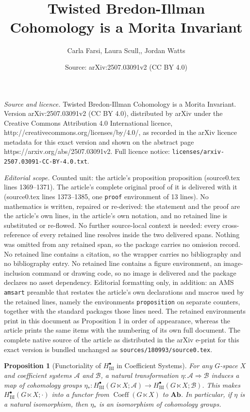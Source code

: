 \documentclass[10pt,a4paper]{amsart}
\title{Twisted Bredon-Illman Cohomology is a Morita Invariant}
\author{Carla Farsi, Laura Scull,, Jordan Watts}
\date{Source: arXiv:2507.03091v2 (CC BY 4.0)}
\newtheorem{proposition}{Proposition}
\newcommand{\Ab}{{\mathbf{Ab}}} %
\newcommand{\BI}{{\operatorname{BI}}} %
\newcommand{\Coeff}{{\operatorname{Coeff}}} %
\newcommand{\calA}{{\mathcal{A}}}
\newcommand{\calB}{{\mathcal{B}}}
\newcommand{\labell}[1]{\label{#1} \printname{#1}}
\newcommand{\printname}[1]{}
\begin{document}
\maketitle

\noindent\emph{Source and licence.} Twisted Bredon-Illman Cohomology is a Morita Invariant. Version arXiv:2507.03091v2 (CC BY 4.0), distributed by arXiv under the Creative Commons Attribution 4.0 International licence, http://creativecommons.org/licenses/by/4.0/, as recorded in the arXiv licence metadata for this exact version and shown on the abstract page https://arxiv.org/abs/2507.03091v2. Full licence notice: \texttt{licenses/arxiv-2507.03091-CC-BY-4.0.txt}.\par\smallskip

\noindent\textit{Editorial scope.} Counted unit: the article's proposition proposition (source0.tex lines 1369--1371). The article's complete original proof of it is delivered with it (source0.tex lines 1373--1385, one \texttt{proof} environment of 13 lines). No mathematics is written, repaired or re-derived: the statement and the proof are the article's own lines, in the article's own notation, and no retained line is substituted or re-flowed.  No further source-local context is needed: every cross-reference of every retained line resolves inside the two delivered spans.  Nothing was omitted from any retained span, so the package carries no omission record.  No retained line contains a citation, so the wrapper carries no bibliography and no bibliography entry.  No retained line contains a figure environment, an image-inclusion command or drawing code, so no image is delivered and the package declares no asset dependency.  Editorial formatting only, in addition: an AMS \texttt{amsart} preamble that restates the article's own declarations and macros used by the retained lines, namely the environments \texttt{proposition} on separate counters, together with the standard packages those lines need.  The retained environments print in this document as Proposition 1 in order of appearance, whereas the article prints the same items with the numbering of its own full document.  The complete native source of the article as distributed in the arXiv e-print for this exact version is bundled unchanged as \texttt{sources/180993/source0.tex}.
    \begin{proposition}[Functoriality of $H_\BI^\bullet$ in Coefficient Systems]\labell{p:nat isom cohom}
        For any $G$-space $X$ and coefficient systems $\calA$ and $\calB$, a natural transformation $\eta\colon\calA\Rightarrow\calB$ induces a map of cohomology groups $\eta_*\colon H^\bullet_\BI(G\ltimes X;\calA)\to H^\bullet_\BI(G\ltimes X;\calB)$.  This makes $H^\bullet_\BI(G\ltimes X;\cdot)$ into a functor from $\Coeff(G\ltimes X)$ to $\Ab$.  In particular, if $\eta$ is a natural isomorphism, then $\eta_*$ is an isomorphism of cohomology groups.
    \end{proposition}
\end{document}
